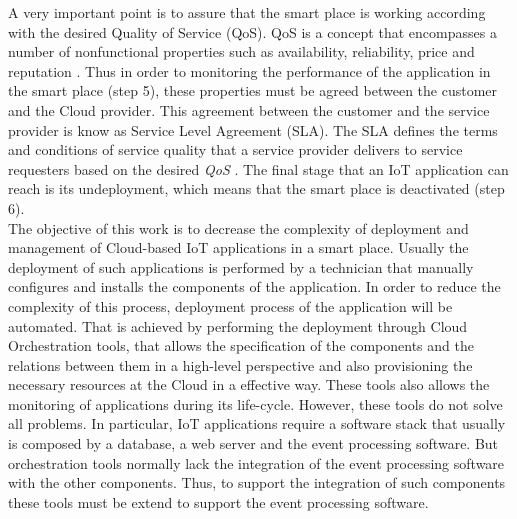 A very important point is to assure that the smart place is working according with the
desired Quality of Service (QoS). QoS is a concept that encompasses a number of nonfunctional
properties such as availability, reliability, price and reputation \cite{o2002s}.
Thus in order to monitoring the performance of the application in the smart place (step 5),
these properties must be agreed between the customer and the Cloud provider.
This agreement between the customer and the service provider is know as Service Level Agreement (SLA).
The SLA defines the terms and conditions of service quality that a service provider delivers
to service requesters based on the desired \textit{QoS} \cite{zeng2004qos}. The final stage
that an IoT application can reach is its undeployment, which means that the smart place is deactivated (step 6).\\

The objective of this work is to decrease the complexity of deployment and management
of Cloud-based IoT applications in a smart place. Usually the deployment of such applications
is performed by a technician that manually configures and installs the components of the application.
In order to reduce the complexity of this process, deployment process of the application will be automated.
That is achieved by performing the deployment through Cloud Orchestration tools, that allows the specification
of the components and the relations between them in a high-level perspective and also provisioning
the necessary resources at the Cloud in a effective way. These tools also allows the monitoring
of applications during its life-cycle. However, these tools do not solve all problems.
In particular, IoT applications require a software stack that usually is composed by a database,
a web server and the event processing software. But orchestration tools normally lack the
integration of the event processing software with the other components. Thus, to support the
integration of such components these tools must be extend to support the event processing software.\\

